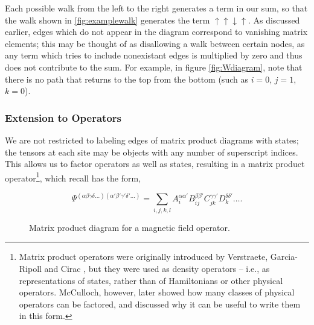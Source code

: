 \documentclass[12pt]{amsbook}
\theoremstyle{plain}
\theoremstyle{definition}
\theoremstyle{remark}
\begin{document}
Each possible walk from the left to the right generates a term in our sum, so that the walk shown in \ref{fig:examplewalk} generates the term $\uparrow\uparrow\downarrow\uparrow$.  As discussed earlier, edges which do not appear in the diagram correspond to vanishing matrix elements;  this may be thought of as disallowing a walk between certain nodes, as any term which tries to include nonexistant edges is multiplied by zero and thus does not contribute to the sum.  For example, in figure \ref{fig:Wdiagram}, note that there is no path that returns to the top from the bottom (such as $i=0$, $j=1$, $k=0$).
\subsubsection{Extension to Operators}

We are not restricted to labeling edges of matrix product diagrams with states;  the tensors at each site may be objects with any number of superscript indices.  This allows us to factor operators as well as states, resulting in a matrix product operator\footnote{Matrix product operators were originally introduced by Verstraete, Garcia-Ripoll and Cirac \cite{cond-mat/0406426}, but they were used as density operators -- i.e., as representations of states, rather than of Hamiltonians or other physical operators.  McCulloch, however, later showed how many classes of physical operators can be factored, and discussed why it can be useful to write them in this form\cite{cond-mat/0701428}.}, which recall has the form,

$$\Psi^{(\alpha\beta\gamma\delta\dots)(\alpha'\beta'\gamma'\delta'\dots)} = \sum_{i,j,k,l} A_i^{\alpha\alpha'} B_{ij}^{\beta\beta'} C_{jk}^{\gamma\gamma'} D_{k}^{\delta\delta'} \dots.$$

\begin{figure}
\caption{Matrix product diagram for a magnetic field operator. \label{fig:magfield}}
\end{figure}
\end{document}
